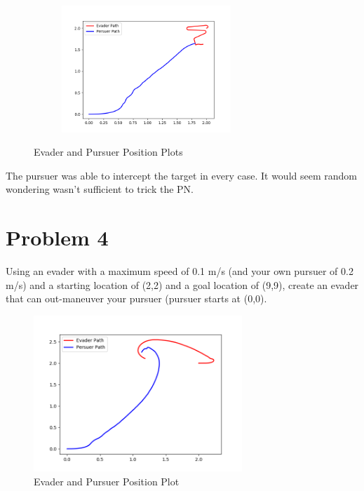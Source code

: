 \documentclass{article}
\begin{document}
\begin{figure}[H]
    \begin{subfigure}[b]{0.5\textwidth}
        \centering
        \includegraphics[width=0.7\textwidth]{images/question3c.png}
        \label{fig:question3c}
    \end{subfigure}
    \caption{Evader and Pursuer Position Plots}
    \label{fig:question3}
\end{figure}

\bigskip
\noindent The pursuer was able to intercept the target in every case. It would seem random wondering wasn't sufficient to trick the PN.

\section*{Problem 4}

Using an evader with a maximum speed of 0.1 m/s (and your own pursuer of 0.2 m/s) and a starting 
location of (2,2) and a goal location of (9,9), create an evader that can out-maneuver your pursuer
(pursuer starts at (0,0).

\bigskip
\begin{figure}[H]
\centering
\includegraphics[width=0.7\textwidth]{images/question4.png}
\caption{Evader and Pursuer Position Plot}
\label{fig:question4}
\end{figure}
\end{document}
